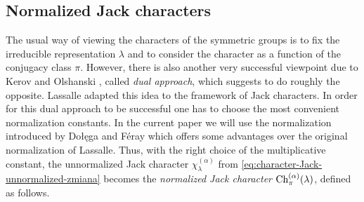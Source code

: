 \documentclass[12pt,usenames,dvipsnames,svgnames,table]{amsart}
\begin{document}
\subsection{Normalized Jack characters}
The usual way of viewing the characters of the symmetric groups is to fix the 
irreducible representation $\lambda$
and to consider the character as a function of the conjugacy class $\pi$.
However, there is also another very successful viewpoint due to 
Kerov and Olshanski \cite{KerovOlshanski1994}, 
called \emph{dual approach}, which suggests
to do roughly the opposite. Lassalle \cite{Lassalle2008a,Lassalle2009} adapted this idea to
the framework of Jack characters.
In order for this dual approach to be successful 
one has to choose the most convenient normalization constants.
In the current paper we will use the normalization introduced by Dołęga and F\'eray 
\cite{DolegaFeray2014} 
which offers some advantages over the original normalization of Lassalle. 
Thus, with the right choice of the multiplicative constant, the unnormalized Jack character
$\chi^{(\alpha)}_\lambda$ from \eqref{eq:character-Jack-unnormalized-zmiana}
becomes the \emph{normalized Jack character $\operatorname{Ch}^{(\alpha)}_\pi(\lambda)$}, defined as follows.
\end{document}
